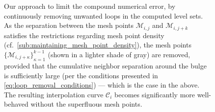 \begin{figure}[htpb]
    \centering
    \resizebox{0.9\linewidth}{!}{}
    \caption[Our approach to limit the compound numerical error, by continuously
    removing unwanted loops in the computed level sets]
    {Our approach to limit the compound numerical error, by continuously
    removing unwanted loops in the computed level sets. As the separation
between the mesh points $\mathcal{M}_{i,j}$ and $\mathcal{M}_{i,j+k}$
satisfies the restrictions regarding mesh point density
(cf.\ \cref{sub:maintaining_mesh_point_density}), the mesh points
${\{\mathcal{M}_{i,j+\kappa}\}}_{\kappa=1}^{k-1}$ (shown in a lighter
shade of gray) are removed, provided that the cumulative neighbor separation
around the bulge is sufficiently large (per the conditions presented in
\cref{eq:loop_removal_conditions}) --- which is the case in the above.
The resulting interpolation curve $\mathcal{C}_{i}$ becomes significantly
more well-behaved without the superfluous mesh points.
}
    \label{fig:loop_removal}
\end{figure}
